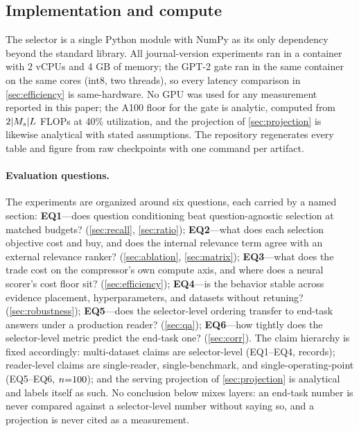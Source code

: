 \documentclass[preprint,12pt]{elsarticle}
\DeclarePairedDelimiter\abs{\lvert}{\rvert}
\theoremstyle{remark}
\begin{document}
\subsection{Implementation and compute}
The selector is a single Python module with NumPy as its only
dependency beyond the standard library. All journal-version
experiments ran in a container with 2 vCPUs and 4 GB of memory; the
GPT-2 gate ran in the same container on the same cores (int8, two
threads), so every latency comparison in \autoref{sec:efficiency} is
same-hardware. No GPU was used for any measurement reported in this
paper; the A100 floor for the gate is analytic, computed from
$2\abs{M_s} L$ FLOPs at 40\% utilization, and the projection of
\autoref{sec:projection} is likewise analytical with stated
assumptions. The repository regenerates every table and figure from
raw checkpoints with one command per artifact.

\paragraph{Evaluation questions.}
The experiments are organized around six questions, each carried by a
named section: \textbf{EQ1}---does question conditioning beat
question-agnostic selection at matched budgets?
(\autoref{sec:recall}, \autoref{sec:ratio});
\textbf{EQ2}---what does each selection objective cost and buy, and
does the internal relevance term agree with an external relevance
ranker? (\autoref{sec:ablation}, \autoref{sec:matrix});
\textbf{EQ3}---what does the trade cost on the compressor's own
compute axis, and where does a neural scorer's cost floor sit?
(\autoref{sec:efficiency});
\textbf{EQ4}---is the behavior stable across evidence placement,
hyperparameters, and datasets without retuning?
(\autoref{sec:robustness});
\textbf{EQ5}---does the selector-level ordering transfer to end-task
answers under a production reader? (\autoref{sec:qa});
\textbf{EQ6}---how tightly does the selector-level metric predict
the end-task one? (\autoref{sec:corr}).
The claim hierarchy is fixed accordingly: multi-dataset claims are
selector-level (EQ1--EQ4, \TotalRecords{} records); reader-level
claims are single-reader, single-benchmark, and
single-operating-point (EQ5--EQ6, $n{=}100$); and the serving
projection of \autoref{sec:projection} is analytical and labels itself
as such. No conclusion below mixes layers:
an end-task number is never compared against a selector-level number
without saying so, and a projection is never cited as a measurement.
\end{document}
